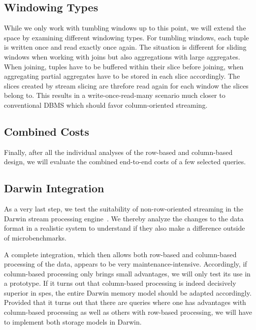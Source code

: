 \subsection{Windowing Types}

While we only work with tumbling windows up to this point, we will extend the space by examining different windowing types.
For tumbling windows, each tuple is written once and read exactly once again.
The situation is different for sliding windows when working with joins but also aggregations with large aggregates.
When joining, tuples have to be buffered within their slice before joining, when aggregating partial aggregates have to be stored in each slice accordingly.
The slices created by stream slicing are threfore read again for each window the slices belong to.
This results in a write-once-read-many scenario much closer to conventional DBMS which should favor column-oriented streaming.

\subsection{Combined Costs}

Finally, after all the individual analyses of the row-based and column-based design, we will evaluate the combined end-to-end costs of a few selected queries.

\subsection{Darwin Integration}

As a very last step, we test the suitability of non-row-oriented streaming in the Darwin stream processing engine~\cite[]{DBLP:conf/cidr/BensonR22}.
We thereby analyze the changes to the data format in a realistic system to understand if they also make a difference outside of microbenchmarks.

A complete integration, which then allows both row-based and column-based processing of the data, appears to be very maintenance-intensive.
Accordingly, if column-based processing only brings small advantages, we will only test its use in a prototype.
If it turns out that column-based processing is indeed decisively superior in \acp{spe}, the entire Darwin memory model should be adapted accordingly.
Provided that it turns out that there are queries where one has advantages with column-based processing as well as others with row-based processing, we will have to implement both storage models in Darwin.